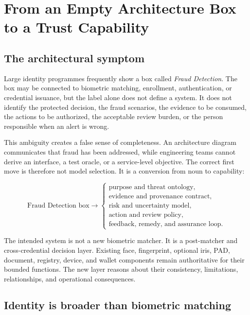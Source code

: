 \chapter{From an Empty Architecture Box to a Trust Capability}

\section{The architectural symptom}

Large identity programmes frequently show a box called \emph{Fraud Detection}. The box may be connected to biometric matching, enrollment, authentication, or credential issuance, but the label alone does not define a system. It does not identify the protected decision, the fraud scenarios, the evidence to be consumed, the actions to be authorized, the acceptable review burden, or the person responsible when an alert is wrong.

This ambiguity creates a false sense of completeness. An architecture diagram communicates that fraud has been addressed, while engineering teams cannot derive an interface, a test oracle, or a service-level objective. The correct first move is therefore not model selection. It is a conversion from noun to capability:

\begin{equation}
\text{Fraud Detection box}
\longrightarrow
\left\{
\begin{array}{l}
\text{purpose and threat ontology},\\
\text{evidence and provenance contract},\\
\text{risk and uncertainty model},\\
\text{action and review policy},\\
\text{feedback, remedy, and assurance loop}.
\end{array}
\right.
\end{equation}

The intended system is not a new biometric matcher. It is a post-matcher and cross-credential decision layer. Existing face, fingerprint, optional iris, PAD, document, registry, device, and wallet components remain authoritative for their bounded functions. The new layer reasons about their consistency, limitations, relationships, and operational consequences.

\section{Identity is broader than biometric matching}

